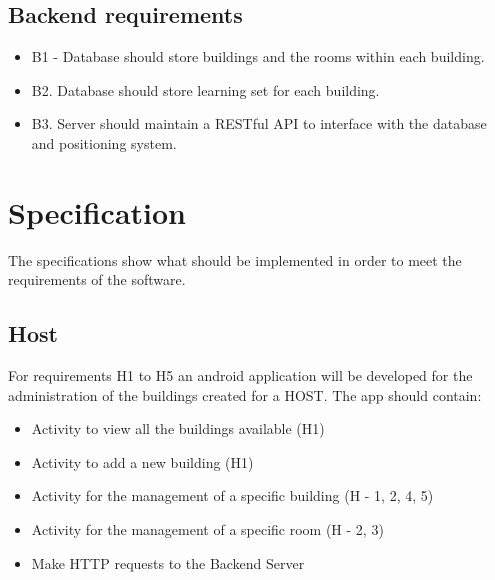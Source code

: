 \subsection{Backend requirements}
	\begin{itemize}
		\item B1 - Database should store buildings and the rooms within each building. 
		\item B2. Database should store learning set for each building.
		\item B3. Server should maintain a RESTful API to interface with the database and positioning 			system.
	\end{itemize}


\section{Specification}
The specifications show what should be implemented in order to meet the requirements of the software.

\subsection{Host}
For requirements H1 to H5 an android application will be developed for the administration of the buildings created for a HOST. The app should contain:
	\begin{itemize}
		\item Activity to view all the buildings available (H1)
		\item Activity to add a new building (H1)
		\item Activity for the management of a specific building (H - 1, 2, 4, 5)
		\item Activity for the management of a specific room (H - 2, 3)
		\item Make HTTP requests to the Backend Server
	\end{itemize}

